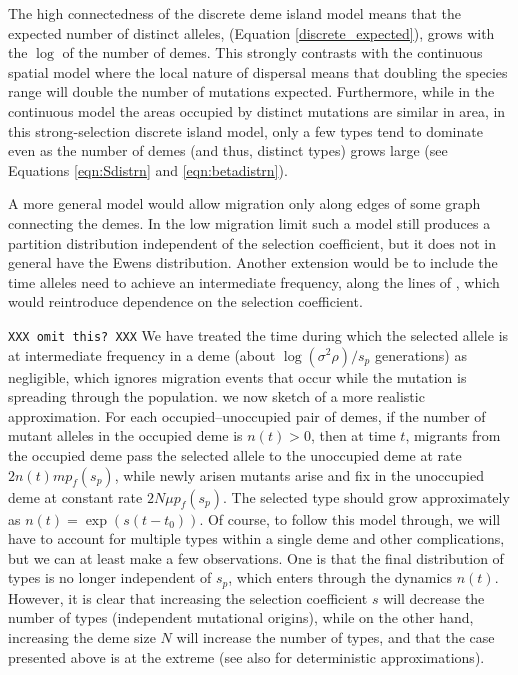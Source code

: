 \documentclass{article}
\begin{document}

The high connectedness of the discrete deme island model means that the expected number of distinct alleles, (Equation \eqref{discrete_expected}), 
grows with the $\log$ of the number of demes. This strongly contrasts with the continuous spatial model where the local nature of dispersal means that doubling the species range will double the number of mutations expected. 
Furthermore, while in the continuous model the areas occupied by distinct mutations are similar in area, in this strong-selection discrete island model, 
only a few types tend to dominate even as the number of demes (and thus, distinct types) grows large (see Equations \eqref{eqn:Sdistrn} and \eqref{eqn:betadistrn}).

A more general model would allow migration only along edges of some graph connecting the demes.
In the low migration limit such a model still produces a partition distribution independent of the selection coefficient,
but it does not in general have the Ewens distribution.
Another extension would be to include the time alleles need to achieve an intermediate frequency,
along the lines of \citet{Navarro:03}, which would reintroduce dependence on the selection coefficient.

\texttt{XXX omit this? XXX}
We have treated the time during which the selected allele is at intermediate frequency in a deme (about $\log(\sigma^2 \rho)/s_p$ generations) as negligible, 
which ignores migration events that occur while the mutation is spreading through the population. 
we now sketch of a more realistic approximation.
For each occupied--unoccupied pair of demes, if the number of mutant alleles in the occupied deme is $n(t)>0$,
then at time $t$, migrants from the occupied deme pass the selected allele to the unoccupied deme at rate $2 n(t) m p_f(s_p)$,
while newly arisen mutants arise and fix in the unoccupied deme at constant rate $2 N \mu p_f(s_p)$.
The selected type should grow approximately as $n(t)=\exp(s(t-t_0))$.
Of course, to follow this model through, we will have to account for multiple types within a single deme and other complications,
but we can at least make a few observations.
One is that the final distribution of types is no longer independent of $s_p$, which enters through the dynamics $n(t)$.
However, it is clear that increasing the selection coefficient $s$ will decrease the number of types (independent mutational origins),
while on the other hand, increasing the deme size $N$ will increase the number of types,
and that the case presented above is at the extreme (see also \cite{Navarro:03} for deterministic approximations). 
\end{document}
